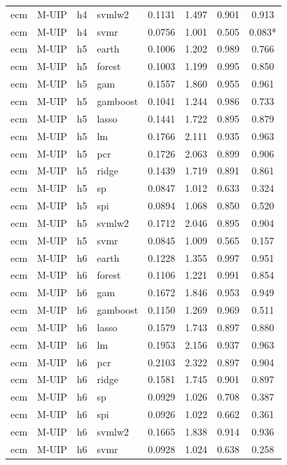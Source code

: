 \begin{ThreePartTable}
\begin{longtable}[t]{llclcccc}
ecm & M-UIP & h4 & svmlw2 & 0.1131 & 1.497 & 0.901 & 0.913\\
ecm & M-UIP & h4 & svmr & 0.0756 & 1.001 & 0.505 & 0.083*\\
\addlinespace
ecm & M-UIP & h5 & earth & 0.1006 & 1.202 & 0.989 & 0.766\\
ecm & M-UIP & h5 & forest & 0.1003 & 1.199 & 0.995 & 0.850\\
ecm & M-UIP & h5 & gam & 0.1557 & 1.860 & 0.955 & 0.961\\
ecm & M-UIP & h5 & gamboost & 0.1041 & 1.244 & 0.986 & 0.733\\
ecm & M-UIP & h5 & lasso & 0.1441 & 1.722 & 0.895 & 0.879\\
ecm & M-UIP & h5 & lm & 0.1766 & 2.111 & 0.935 & 0.963\\
ecm & M-UIP & h5 & pcr & 0.1726 & 2.063 & 0.899 & 0.906\\
ecm & M-UIP & h5 & ridge & 0.1439 & 1.719 & 0.891 & 0.861\\
ecm & M-UIP & h5 & sp & 0.0847 & 1.012 & 0.633 & 0.324\\
ecm & M-UIP & h5 & spi & 0.0894 & 1.068 & 0.850 & 0.520\\
ecm & M-UIP & h5 & svmlw2 & 0.1712 & 2.046 & 0.895 & 0.904\\
ecm & M-UIP & h5 & svmr & 0.0845 & 1.009 & 0.565 & 0.157\\
\addlinespace
ecm & M-UIP & h6 & earth & 0.1228 & 1.355 & 0.997 & 0.951\\
ecm & M-UIP & h6 & forest & 0.1106 & 1.221 & 0.991 & 0.854\\
ecm & M-UIP & h6 & gam & 0.1672 & 1.846 & 0.953 & 0.949\\
ecm & M-UIP & h6 & gamboost & 0.1150 & 1.269 & 0.969 & 0.511\\
ecm & M-UIP & h6 & lasso & 0.1579 & 1.743 & 0.897 & 0.880\\
ecm & M-UIP & h6 & lm & 0.1953 & 2.156 & 0.937 & 0.963\\
ecm & M-UIP & h6 & pcr & 0.2103 & 2.322 & 0.897 & 0.904\\
ecm & M-UIP & h6 & ridge & 0.1581 & 1.745 & 0.901 & 0.897\\
ecm & M-UIP & h6 & sp & 0.0929 & 1.026 & 0.708 & 0.387\\
ecm & M-UIP & h6 & spi & 0.0926 & 1.022 & 0.662 & 0.361\\
ecm & M-UIP & h6 & svmlw2 & 0.1665 & 1.838 & 0.914 & 0.936\\
ecm & M-UIP & h6 & svmr & 0.0928 & 1.024 & 0.638 & 0.258\\

\end{longtable}
\end{ThreePartTable}
